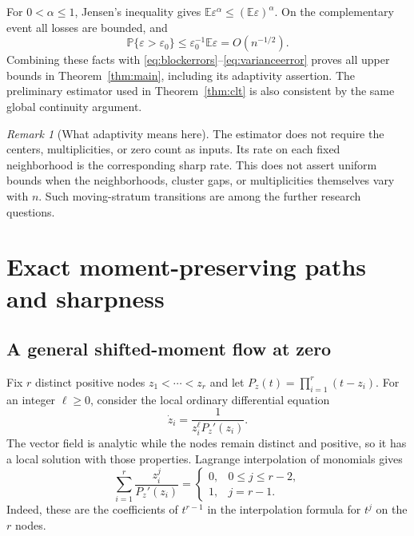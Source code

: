 \documentclass[11pt,a4paper]{article}
\numberwithin{equation}{section}
\theoremstyle{definition}
\theoremstyle{remark}
\newtheorem{remark}[theorem]{Remark}
\newcommand{\E}{\mathbb E}
\newcommand{\Pp}{\mathbb P}
\begin{document}
For $0<\alpha\le1$, Jensen's inequality gives
$\E\varepsilon^\alpha\le(\E\varepsilon)^\alpha$.
On the complementary event all losses are bounded, and
\begin{equation}
 \Pp\{\varepsilon>\varepsilon_0\}\le
       \varepsilon_0^{-1}\E\varepsilon=O(n^{-1/2}).
\end{equation}
Combining these facts with \eqref{eq:blockerrors}--\eqref{eq:varianceerror}
proves all upper bounds in Theorem~\ref{thm:main}, including its adaptivity
assertion. The preliminary estimator used in Theorem~\ref{thm:clt} is also
consistent by the same global continuity argument.

\begin{remark}[What adaptivity means here]
The estimator does not require the centers, multiplicities, or zero count as
inputs. Its rate on each fixed neighborhood is the corresponding sharp rate.
This does not assert uniform bounds when the neighborhoods, cluster gaps, or
multiplicities themselves vary with $n$. Such moving-stratum transitions are
among the further research questions.
\end{remark}

\section{Exact moment-preserving paths and sharpness}
\label{sec:hardpaths}

\subsection{A general shifted-moment flow at zero}
Fix $r$ distinct positive nodes $z_1<\cdots<z_r$ and let
$P_z(t)=\prod_{i=1}^r(t-z_i)$. For an integer $\ell\ge0$, consider the local
ordinary differential equation
\begin{equation}
 \dot z_i=\frac{1}{z_i^\ell P_z'(z_i)}.
 \label{eq:flow}
\end{equation}
The vector field is analytic while the nodes remain distinct and positive,
so it has a local solution with those properties. Lagrange interpolation of
monomials gives
\begin{equation}
 \sum_{i=1}^r\frac{z_i^j}{P_z'(z_i)}=
 \begin{cases}
 0,&0\le j\le r-2,\\
 1,&j=r-1.
 \end{cases}
 \label{eq:lagrangeidentities}
\end{equation}
Indeed, these are the coefficients of $t^{r-1}$ in the interpolation formula
for $t^j$ on the $r$ nodes.
\end{document}
